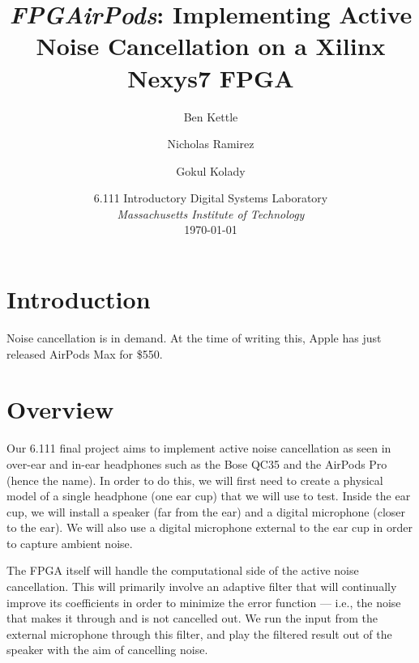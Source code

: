 \documentclass{fpgairpods}
\begin{document}
\title{\textit{FPGAirPods}: Implementing Active Noise Cancellation on a Xilinx Nexys7 FPGA}
\date{6.111 Introductory Digital Systems Laboratory \\ \textit{Massachusetts Institute of Technology} \\ \today}
\author{Ben Kettle \\  
\and Nicholas Ramirez \\  \and Gokul Kolady \\ }

\maketitle
\tableofcontents

\newpage
\begin{multicols}{2}
\section{Introduction}

	Noise cancellation is in demand. At the time of writing this, Apple has just released AirPods Max for \$550.

\section{Overview}
Our 6.111 final project aims to implement active noise cancellation as seen in over-ear and in-ear headphones such as the Bose QC35 and the AirPods Pro (hence the name). In order to do this, we will first need to create a physical model of a single headphone (one ear cup) that we will use to test. Inside the ear cup, we will install a speaker (far from the ear) and a digital microphone (closer to the ear). We will also use a digital microphone external to the ear cup in order to capture ambient noise.

The FPGA itself will handle the computational side of the active noise cancellation. This will primarily involve an adaptive filter that will continually improve its coefficients in order to minimize the error function --- i.e., the noise that makes it through and is not cancelled out. We run the input from the external microphone through this filter, and play the filtered result out of the speaker with the aim of cancelling noise.


\end{multicols}
\end{document}
